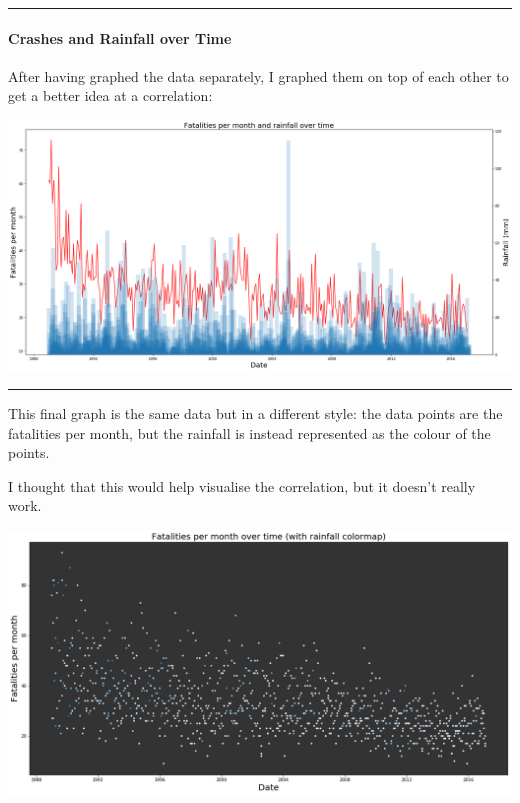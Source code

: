 \documentclass{article}
\begin{document}
\begin{center}\rule{0.5\linewidth}{\linethickness}\end{center}

\paragraph{Crashes and Rainfall over
Time}\label{crashes-and-rainfall-over-time}

After having graphed the data separately, I graphed them on top of each
other to get a better idea at a correlation:

\href{assets/rainfall_vs_deaths.png}{\includegraphics{assets/rainfall_vs_deaths.png}}

\begin{center}\rule{0.5\linewidth}{\linethickness}\end{center}

This final graph is the same data but in a different style: the data
points are the\\
fatalities per month, but the rainfall is instead represented as the
colour of the points.

I thought that this would help visualise the correlation, but it doesn't
really work.

\href{assets/fatalities_vs_date.png}{\includegraphics{assets/fatalities_vs_date.png}}
\end{document}
